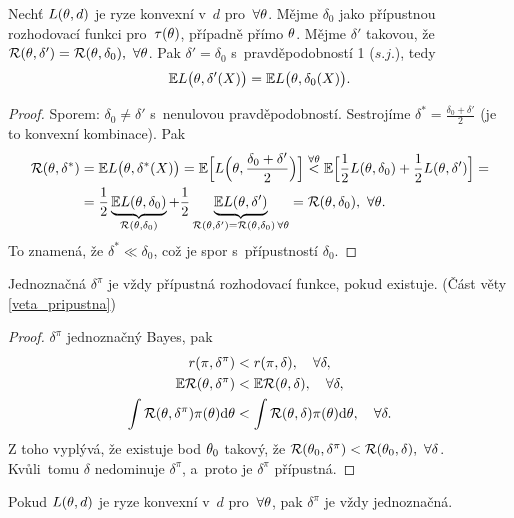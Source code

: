 \begin{theorem}\label{veta_rovnost}
	Nechť $L(\theta,d)$ je ryze konvexní v~$d$ pro~$\forall\theta$. Mějme $\delta_0$ jako přípustnou rozhodovací funkci pro~$\tau(\theta)$, případně přímo $\theta$. Mějme $\delta'$ takovou, že $\mathcal{R}(\theta,\delta')=\mathcal{R}(\theta,\delta_0),~\forall\theta$. Pak $\delta'=\delta_0$ s~pravděpodobností 1 ($s.j.$), tedy $$ \mathbb{E} L\big(\theta,\delta'(X)\big)=\mathbb{E} L\big(\theta,\delta_0(X)\big).$$
	\begin{proof}
		Sporem: $\delta_0\neq\delta'$ s~nenulovou pravděpodobností. Sestrojíme $\delta^\ast=\frac{\delta_0+\delta'}{2}$ (je to konvexní kombinace). Pak
		\[
		\begin{split}
		\mathcal{R}(\theta,\delta^\ast)&=\mathbb{E} L\big(\theta,\delta^\ast(X)\big)=\mathbb{E}\Big[L\Big(\theta,\frac{\delta_0+\delta'}{2}\Big)\Big]\overset{\forall\theta}{<}\mathbb{E}\Big[\frac{1}{2}L(\theta,\delta_0)+\frac{1}{2}L(\theta,\delta')\Big]=\\&= \frac{1}{2}\underbrace{\mathbb{E} L(\theta,\delta_0)}_{\mathcal{R}(\theta,\delta_0)}+\frac{1}{2}\underbrace{\mathbb{E} L(\theta,\delta')}_{\mathcal{R}(\theta,\delta')=\mathcal{R}(\theta,\delta_0)\,\forall\theta}=\mathcal{R}(\theta,\delta_0),~\forall\theta.
		\end{split}
		\] 
		To znamená, že $\delta^\ast\ll\delta_0$, což je spor s~přípustností $\delta_0$.
	\end{proof}
\end{theorem}
\begin{theorem} \label{veta_prip}
	Jednoznačná $\delta^\pi$ je vždy přípustná rozhodovací funkce, pokud existuje. (Část věty \ref{veta_pripustna})
	\begin{proof}
		$\delta^\pi$ jednoznačný Bayes, pak \[
		\begin{split}
		r(\pi,\delta^\pi)&<r(\pi,\delta),\quad\forall\delta,\\
		\mathbb{E} \mathcal{R}(\theta,\delta^\pi)&<\mathbb{E} \mathcal{R}(\theta,\delta),\quad\forall\delta,\\
		\int\mathcal{R}(\theta,\delta^\pi)\pi(\theta)\mathrm{d}\theta&<\int\mathcal{R}(\theta,\delta)\pi(\theta)\mathrm{d}\theta,\quad\forall\delta.		
		\end{split}
		\]
		Z toho vyplývá, že existuje bod $\theta_0$ takový, že  $\mathcal{R}(\theta_0,\delta^\pi)<\mathcal{R}(\theta_0,\delta),~\forall\delta$. Kvůli~tomu $\delta$ nedominuje $\delta^\pi$, a~proto je $\delta^\pi$ přípustná.
	\end{proof}
\end{theorem}
\begin{remark}
	Pokud $L(\theta,d)$ je ryze konvexní v~$d$ pro~$\forall\theta$, pak $\delta^\pi$ je vždy jednoznačná.
\end{remark}
